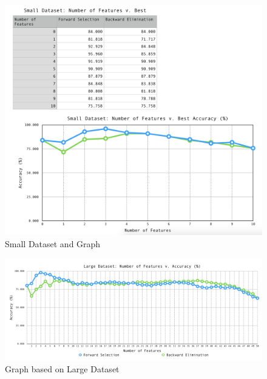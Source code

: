 \documentclass{article}
\begin{document}
   \begin{figure}[!h]
  \includegraphics[width=\textwidth,height=\textheight,keepaspectratio]{SmallDataSetGraph.png}
  \caption{Small Dataset and Graph}
\end{figure}

\begin{figure}
  \includegraphics[width=\textwidth,height=\textheight,keepaspectratio]{LargeTestDataGraph.png}
  \caption{Graph based on Large Dataset}
\end{figure}
\end{document}
